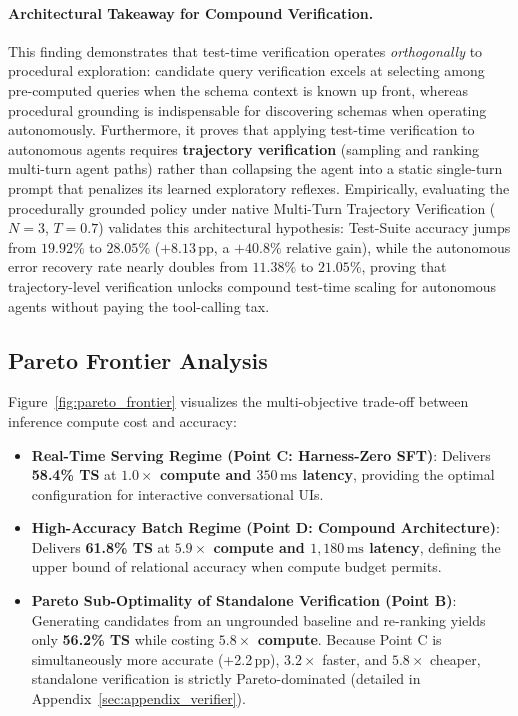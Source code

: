 \documentclass{article}
\theoremstyle{plain}
\theoremstyle{definition}
\theoremstyle{remark}
\begin{document}
\paragraph{Architectural Takeaway for Compound Verification.}
This finding demonstrates that test-time verification operates \emph{orthogonally} to procedural exploration: candidate query verification excels at selecting among pre-computed queries when the schema context is known up front, whereas procedural grounding is indispensable for discovering schemas when operating autonomously. Furthermore, it proves that applying test-time verification to autonomous agents requires \textbf{trajectory verification} (sampling and ranking multi-turn agent paths) rather than collapsing the agent into a static single-turn prompt that penalizes its learned exploratory reflexes. Empirically, evaluating the procedurally grounded policy under native Multi-Turn Trajectory Verification ($N=3$, $T=0.7$) validates this architectural hypothesis: Test-Suite accuracy jumps from $19.92\%$ to $\mathbf{28.05\%}$ ($+8.13$\,pp, a $+40.8\%$ relative gain), while the autonomous error recovery rate nearly doubles from $11.38\%$ to $\mathbf{21.05\%}$, proving that trajectory-level verification unlocks compound test-time scaling for autonomous agents without paying the tool-calling tax.

\subsection{Pareto Frontier Analysis}
Figure~\ref{fig:pareto_frontier} visualizes the multi-objective trade-off between inference compute cost and accuracy:
\begin{itemize}[leftmargin=*,itemsep=1pt]
    \item \textbf{Real-Time Serving Regime (Point C: Harness-Zero SFT)}: Delivers \textbf{58.4\% TS} at \textbf{$1.0\times$ compute and $350\,\text{ms}$ latency}, providing the optimal configuration for interactive conversational UIs.
    \item \textbf{High-Accuracy Batch Regime (Point D: Compound Architecture)}: Delivers \textbf{61.8\% TS} at \textbf{$5.9\times$ compute and $1{,}180\,\text{ms}$ latency}, defining the upper bound of relational accuracy when compute budget permits.
    \item \textbf{Pareto Sub-Optimality of Standalone Verification (Point B)}: Generating candidates from an ungrounded baseline and re-ranking yields only \textbf{56.2\% TS} while costing \textbf{$5.8\times$ compute}. Because Point C is simultaneously more accurate (+2.2\,pp), $3.2\times$ faster, and $5.8\times$ cheaper, standalone verification is strictly Pareto-dominated (detailed in Appendix~\ref{sec:appendix_verifier}).
\end{itemize}
\end{document}

